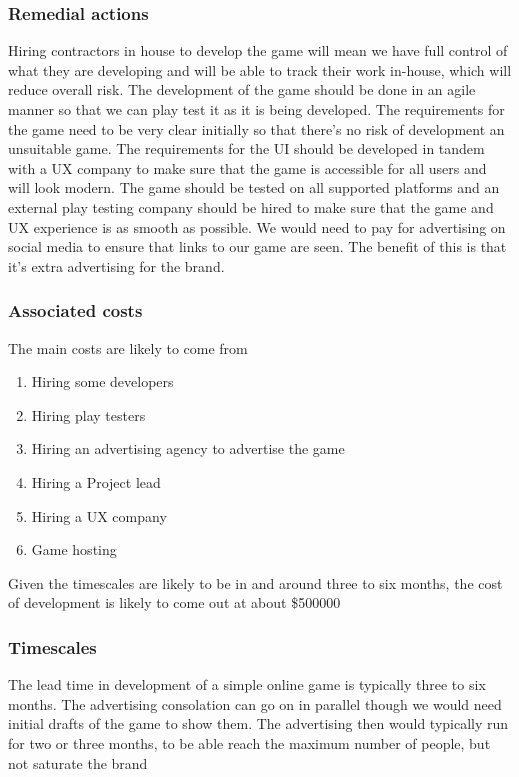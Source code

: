 \documentclass{article}
\begin{document}
\subsubsection{Remedial actions}
Hiring contractors in house to develop the game will mean we have full control of what they are developing and will be able to track their work in-house, which will reduce overall risk.
The development of the game should be done in an agile manner so that we can play test it as it is being developed. The requirements for the game need to be very clear initially so that there's no risk of development an unsuitable game. The requirements for the UI should be developed in tandem with a UX company to make sure that the game is accessible for all users and will look modern.
The game should be tested on all supported platforms and an external play testing company should be hired to make sure that the game and UX experience is as smooth as possible.
We would need to pay for advertising on social media to ensure that links to our game are seen. The benefit of this is that it's extra advertising for the brand.

\subsubsection{Associated costs}
The main costs are likely to come from
\begin{enumerate}
    \item Hiring some developers
    \item Hiring play testers
    \item Hiring an advertising agency to advertise the game
    \item Hiring a Project lead
    \item Hiring a UX company
    \item Game hosting
\end{enumerate}
Given the timescales are likely to be in and around three to six months, the cost of development is likely to come out at about \$500000

\subsubsection{Timescales}
The lead time in development of a simple online game is typically three to six months. The advertising consolation can go on in parallel though we would need initial drafts of the game to show them.
The advertising then would typically run for two or three months, to be able reach the maximum number of people, but not saturate the brand
\end{document}
